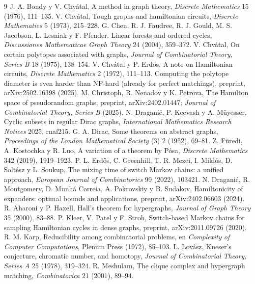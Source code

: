 \documentclass[11pt,a4paper]{article}
\theoremstyle{definition}
\theoremstyle{remark}
\begin{document}
\begin{thebibliography}{9}
 J. A. Bondy y V. Chvátal, A method in graph theory, \emph{Discrete Mathematics} 15 (1976), 111--135.
 V. Chvátal, Tough graphs and hamiltonian circuits, \emph{Discrete Mathematics} 5 (1973), 215--228.
 G. Chen, R. J. Faudree, R. J. Gould, M. S. Jacobson, L. Lesniak y F. Pfender, Linear forests and ordered cycles, \emph{Discussiones Mathematicae Graph Theory} 24 (2004), 359--372.
 V. Chvátal, On certain polytopes associated with graphs, \emph{Journal of Combinatorial Theory, Series B} 18 (1975), 138--154.
 V. Chvátal y P. Erdős, A note on Hamiltonian circuits, \emph{Discrete Mathematics} 2 (1972), 111--113.
 Computing the polytope diameter is even harder than NP-hard (already for perfect matchings), preprint, arXiv:2502.16398 (2025).
 M. Christoph, R. Nenadov y K. Petrova, The Hamilton space of pseudorandom graphs, preprint, arXiv:2402.01447; \emph{Journal of Combinatorial Theory, Series B} (2025).
 N. Draganić, P. Keevash y A. Müyesser, Cyclic subsets in regular Dirac graphs, \emph{International Mathematics Research Notices} 2025, rnaf215.
 G. A. Dirac, Some theorems on abstract graphs, \emph{Proceedings of the London Mathematical Society} (3) 2 (1952), 69--81.
 Z. Füredi, A. Kostochka y R. Luo, A variation of a theorem by Pósa, \emph{Discrete Mathematics} 342 (2019), 1919--1923.
 P. L. Erdős, C. Greenhill, T. R. Mezei, I. Miklós, D. Soltész y L. Soukup, The mixing time of switch Markov chains: a unified approach, \emph{European Journal of Combinatorics} 99 (2022), 103421.
 N. Draganić, R. Montgomery, D. Munhá Correia, A. Pokrovskiy y B. Sudakov, Hamiltonicity of expanders: optimal bounds and applications, preprint, arXiv:2402.06603 (2024).
 R. Aharoni y P. Haxell, Hall's theorem for hypergraphs, \emph{Journal of Graph Theory} 35 (2000), 83--88.
 P. Kleer, V. Patel y F. Stroh, Switch-based Markov chains for sampling Hamiltonian cycles in dense graphs, preprint, arXiv:2011.09726 (2020).
 R. M. Karp, Reducibility among combinatorial problems, en \emph{Complexity of Computer Computations}, Plenum Press (1972), 85--103.
 L. Lovász, Kneser's conjecture, chromatic number, and homotopy, \emph{Journal of Combinatorial Theory, Series A} 25 (1978), 319--324.
 R. Meshulam, The clique complex and hypergraph matching, \emph{Combinatorica} 21 (2001), 89--94.

\end{thebibliography}
\end{document}
